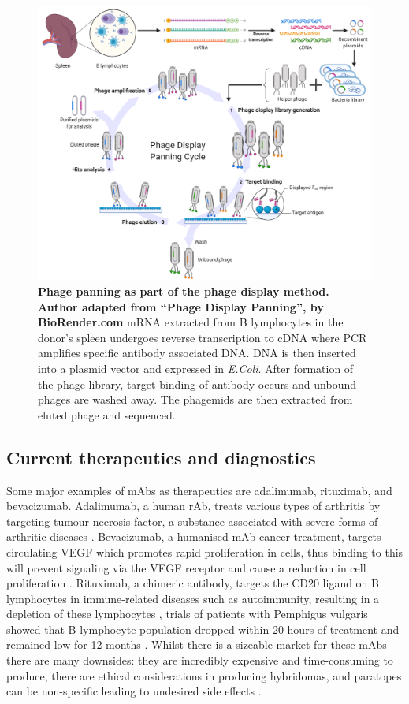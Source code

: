 \begin{figure}[h!]
    \centering
    \includegraphics[width=1\linewidth]{./images/phagepanning.png}
    \caption{\textbf{Phage panning as part of the phage display method. Author adapted from “Phage Display Panning”, by BioRender.com}
    mRNA extracted from B lymphocytes in the donor's spleen undergoes reverse transcription to cDNA where PCR amplifies specific antibody associated DNA. DNA is then inserted into a plasmid vector and expressed in \emph{E.Coli}. After formation of the phage library, target binding of antibody occurs and unbound phages are washed away. The phagemids are then extracted from eluted phage and sequenced.} 
    \label{fig:phagepanning}
\end{figure}

\subsection{Current therapeutics and diagnostics}

Some major examples of mAbs as therapeutics are adalimumab, rituximab, and bevacizumab. Adalimumab, a human rAb, treats various types of arthritis by targeting tumour necrosis factor, a substance associated with severe forms of arthritic diseases \cite{measeAdalimumabTreatmentArthritis2007}. Bevacizumab, a humanised mAb cancer treatment, targets circulating VEGF which promotes rapid proliferation in cells, thus binding to this will prevent signaling via the VEGF receptor and cause a reduction in cell proliferation \cite{kazazi-hyseniBevacizumab2010}. Rituximab, a chimeric antibody, targets the CD20 ligand on B lymphocytes in immune-related diseases such as autoimmunity, resulting in a depletion of these lymphocytes \cite{thurlingsSynovialTissueResponse2008}, trials of patients with Pemphigus vulgaris showed that B lymphocyte population dropped within 20 hours of treatment and remained low for 12 months \cite{emingRituximabExertsDual2008}. Whilst there is a sizeable market for these mAbs there are many downsides: they are incredibly expensive and time-consuming to produce, there are ethical considerations in producing hybridomas, and paratopes can be non-specific leading to undesired side effects \cite{saylorMonoclonalAntibodybasedTherapies2009}.

